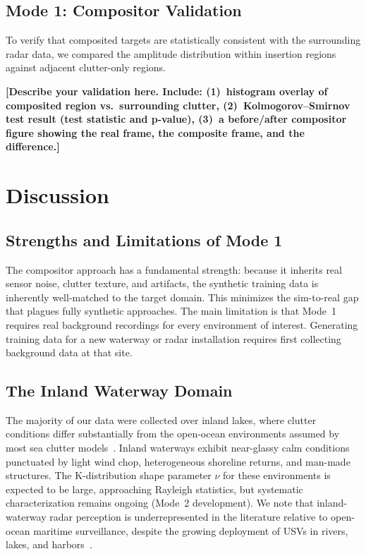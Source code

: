 \documentclass[conf]{new-aiaa}
\newcommand{\ph}[1]{\textbf{[#1]}}
\begin{document}
\subsection{Mode 1: Compositor Validation}

To verify that composited targets are statistically consistent with the surrounding radar data, we compared the amplitude distribution within insertion regions against adjacent clutter-only regions.

\ph{Describe your validation here. Include: (1)~histogram overlay of composited region vs.\ surrounding clutter, (2)~Kolmogorov--Smirnov test result (test statistic and p-value), (3)~a before/after compositor figure showing the real frame, the composite frame, and the difference.}

\section{Discussion}
\label{sec:discussion}

\subsection{Strengths and Limitations of Mode 1}

The compositor approach has a fundamental strength: because it inherits real sensor noise, clutter texture, and artifacts, the synthetic training data is inherently well-matched to the target domain. This minimizes the sim-to-real gap that plagues fully synthetic approaches. The main limitation is that Mode~1 requires real background recordings for every environment of interest. Generating training data for a new waterway or radar installation requires first collecting background data at that site.

\subsection{The Inland Waterway Domain}

The majority of our data were collected over inland lakes, where clutter conditions differ substantially from the open-ocean environments assumed by most sea clutter models~\cite{ward2013sea}. Inland waterways exhibit near-glassy calm conditions punctuated by light wind chop, heterogeneous shoreline returns, and man-made structures. The K-distribution shape parameter $\nu$ for these environments is expected to be large, approaching Rayleigh statistics, but systematic characterization remains ongoing (Mode~2 development). We note that inland-waterway radar perception is underrepresented in the literature relative to open-ocean maritime surveillance, despite the growing deployment of USVs in rivers, lakes, and harbors~\cite{cheng2021robust}.
\end{document}
